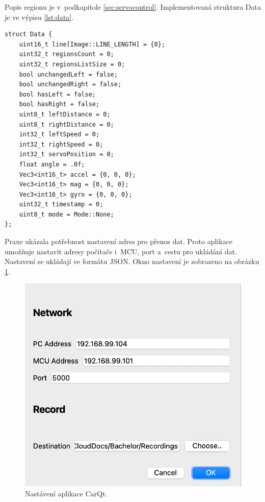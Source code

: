 Popis regionu je v~podkapitole \ref{sec:servocontrol}.
Implementovaná struktura Data je ve výpisu \ref{lst:data}.
\begin{lstlisting}[caption = Struktura Data, label = lst:data]
struct Data {
    uint16_t line[Image::LINE_LENGTH] = {0};
    uint32_t regionsCount = 0;
    uint32_t regionsListSize = 0;
    bool unchangedLeft = false;
    bool unchangedRight = false;
    bool hasLeft = false;
    bool hasRight = false;
    uint8_t leftDistance = 0;
    uint8_t rightDistance = 0;
    int32_t leftSpeed = 0;
    int32_t rightSpeed = 0;
    int32_t servoPosition = 0;
    float angle = .0f;
    Vec3<int16_t> accel = {0, 0, 0};
    Vec3<int16_t> mag = {0, 0, 0};
    Vec3<int16_t> gyro = {0, 0, 0};
    uint32_t timestamp = 0;
    uint8_t mode = Mode::None;
};
\end{lstlisting}

Praxe ukázala potřebnost nastavení adres pro přenos dat. Proto aplikace umožňuje nastavit adresy počítače i~MCU, port a~cestu pro ukládání dat. Nastavení se ukládají ve formátu JSON. Okno nastavení je zobrazeno na obrázku \ref{fig:CarQtSettings}.
\begin{figure}
\centering
    \includegraphics[width = .5\linewidth]{Figures/SettingsWindow.png}
\caption{Nastávení aplikace CarQt.}
\label{fig:CarQtSettings}
\end{figure}

\endinput